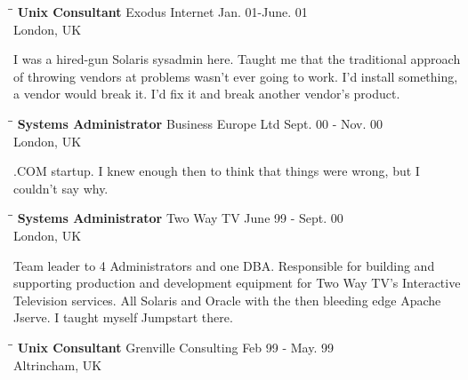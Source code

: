 \documentclass{res}
\begin{document}
\begin{resume}
	\begin{tabbing}
	   \hspace{2.3in}\= \hspace{2.6in}\= \kill %
	    {\bf Unix Consultant} \>Exodus Internet \> Jan. 01-June. 01\\
	                          \>London, UK
	\end{tabbing}\vspace{-20pt}
	I was a hired-gun Solaris sysadmin here.  Taught me that the traditional approach of throwing vendors at problems wasn't ever going to work.  I'd install something, a vendor would break it.  I'd fix it and break another vendor's product.
	
	\begin{tabbing}
	   \hspace{2.3in}\= \hspace{2.6in}\= \kill %
	    {\bf Systems Administrator} \>Business Europe Ltd \> Sept. 00 - Nov. 00\\
	                          \>London, UK
	\end{tabbing}\vspace{-20pt}
	
	.COM startup.  I knew enough then to think that things were wrong, but I couldn't say why.
	\begin{tabbing}
	   \hspace{2.3in}\= \hspace{2.6in}\= \kill %
	    {\bf Systems Administrator} \>Two Way TV \> June 99 - Sept. 00\\
	                          \>London, UK
	\end{tabbing}\vspace{-20pt}
	Team leader to 4 Administrators and one DBA. Responsible for building and supporting production and development equipment for Two Way TV's Interactive Television services.  All Solaris and Oracle with the then bleeding edge Apache Jserve. I taught myself Jumpstart there. 
	
	\begin{tabbing}
	   \hspace{2.3in}\= \hspace{2.6in}\= \kill %
	    {\bf Unix Consultant} \>Grenville Consulting \> Feb 99 - May. 99\\
	                          \>Altrincham, UK
	\end{tabbing}\vspace{-20pt}
	

\end{resume}
\end{document}

